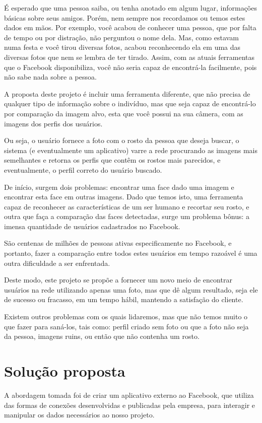 \documentclass[10pt,a4paper]{article}
\begin{document}
É esperado que uma pessoa saiba, ou tenha anotado em algum lugar, informações básicas sobre seus amigos. Porém, nem sempre nos recordamos ou temos estes dados em mãos. Por exemplo, você acabou de conhecer uma pessoa, que por falta de tempo ou por distração, não perguntou o nome dela. Mas, como estavam numa festa e você tirou diversas fotos, acabou reconhecendo ela em uma das diversas fotos que nem se lembra de ter tirado. Assim, com as atuais ferramentas que o Facebook disponibiliza, você não seria capaz de encontrá-la facilmente, pois não sabe nada sobre a pessoa.

A proposta deste projeto é incluir uma ferramenta diferente, que não precisa de qualquer tipo de informação sobre o indivíduo, mas que seja capaz de encontrá-lo por comparação da imagem alvo, esta que você possui na sua câmera, com as imagens dos perfis dos usuários.

Ou seja, o usuário fornece a foto com o rosto da pessoa que deseja buscar, o sistema (e eventualmente um aplicativo) varre a rede procurando as imagens mais semelhantes e retorna os perfis que contêm os rostos mais parecidos, e eventualmente, o perfil correto do usuário buscado.

De início, surgem dois problemas: encontrar uma face dado uma imagem e encontrar esta face em outras imagens. Dado que temos isto, uma ferramenta capaz de reconhecer as características de um ser humano e recortar seu rosto, e outra que faça a comparação das faces detectadas, surge um problema bônus: a imensa quantidade de usuários cadastrados no Facebook.

São centenas de milhões de pessoas ativas especificamente no Facebook, e portanto, fazer a comparação entre todos estes usuários em tempo razoável é uma outra dificuldade a ser enfrentada.

Deste modo, este projeto se propõe a fornecer um novo meio de encontrar usuários na rede utilizando apenas uma foto, mas que dê algum resultado, seja ele de sucesso ou fracasso, em um tempo hábil, mantendo a satisfação do cliente.

Existem outros problemas com os quais lidaremos, mas que não temos muito o que fazer para saná-los, tais como: perfil criado sem foto ou que a foto não seja da pessoa, imagens ruins, ou então que não contenha um rosto.

\section{Solução proposta}
A abordagem tomada foi de criar um aplicativo externo ao Facebook, que utiliza das formas de conexões desenvolvidas e publicadas pela empresa, para interagir e manipular os dados necessários ao nosso projeto.
\end{document}
